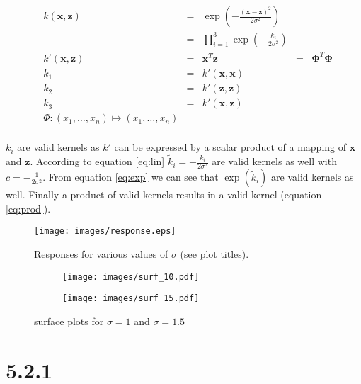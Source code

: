 \documentclass[a4paper,11pt]{article}
\theoremstyle{definition}
\theoremstyle{plain}
\theoremstyle{remark}
\begin{document}
\begin{align}
&k(\boldsymbol{x},\boldsymbol{z})& = &\exp{\left(-\frac{\left(\boldsymbol{x}-\boldsymbol{z}\right)^2}{2\sigma^2}\right)}& \\
&                                & = &\prod_{i=1}^3 \exp{\left(-\frac{k_i}{2\sigma^2}\right)}& \\
&k'(\boldsymbol{x}, \boldsymbol{z})&=& \boldsymbol{x}^T\boldsymbol{z} &=& \boldsymbol{\Phi}^T\boldsymbol{\Phi}\\
&k_1 &=& k'(\boldsymbol{x}, \boldsymbol{x})& \\
&k_2 &=& k'(\boldsymbol{z}, \boldsymbol{z})& \\
&k_3 &=& k'(\boldsymbol{x}, \boldsymbol{z})& \\
&\Phi:  (x_1,\dots,x_n) \mapsto (x_1,\dots,x_n)& \\
\end{align}

$k_i$ are valid kernels as $k'$ can be expressed by a scalar product of a mapping of $\boldsymbol{x}$ and $\boldsymbol{z}$. According to equation \ref{eq:lin} $\tilde k_i = -\frac{k_i}{2\sigma^2}$ are valid kernels as well with $c=-\frac{1}{2\sigma^2}$. From equation \ref{eq:exp} we can see that $\exp\left(\tilde k_i\right)$ are valid kernels as well. Finally a product of valid kernels results in a valid kernel (equation \ref{eq:prod}).

\clearpage

\vspace{50pt}
\begin{figure}[H]
\centering
\texttt{[image: images/response.eps]}
\caption{Responses for various values of $\sigma$ (see plot titles).}
\label{fig:response}
\end{figure}

\begin{figure}[H]
\centering
\begin{subfigure}{0.49\textwidth}
\centering
\texttt{[image: images/surf\_10.pdf]}
\end{subfigure}
\hfill
\begin{subfigure}{0.49\textwidth}
\centering
\texttt{[image: images/surf\_15.pdf]}
\end{subfigure}
\caption{surface plots for $\sigma=1$ and $\sigma=1.5$}
\label{fig:surf}
\end{figure}

\section*{5.2.1}
\end{document}
